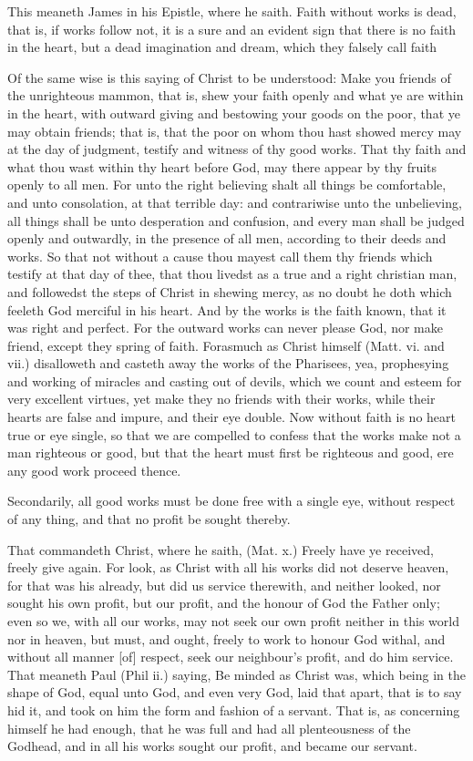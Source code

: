This meaneth James in his Epistle, where he saith. Faith 
without works is dead, that is, if works follow not, it is a 
sure and an evident sign that there is no faith in the heart, but 
a dead imagination and dream, which they falsely call faith 

Of the same wise is this saying of Christ to be understood:
Make you friends of the unrighteous mammon, that is, 
shew your faith openly and what ye are within in the heart, 
with outward giving and bestowing your goods on the poor, 
that ye may obtain friends; that is, that the poor on whom 
thou hast showed mercy may at the day of judgment, testify
and witness of thy good works. That thy faith and what 
thou wast within thy heart before God, may there appear 
by thy fruits openly to all men. For unto the right believing
shalt all things be comfortable, and unto consolation, 
at that terrible day: and contrariwise unto the unbelieving, 
all things shall be unto desperation and confusion, and 
every man shall be judged openly and outwardly, in the 
presence of all men, according to their deeds and works. 
So that not without a cause thou mayest call them thy 
friends which testify at that day of thee, that thou livedst as 
a true and a right christian man, and followedst the steps 
of Christ in shewing mercy, as no doubt he doth which 
feeleth God merciful in his heart. And by the works is the 
faith known, that it was right and perfect. For the outward 
works can never please God, nor make friend, except they 
spring of faith. Forasmuch as Christ himself (Matt. vi. and 
vii.) disalloweth and casteth away the works of the Pharisees, 
yea, prophesying and working of miracles and casting out 
of devils, which we count and esteem for very excellent 
virtues, yet make they no friends with their works, while 
their hearts are false and impure, and their eye double. 
Now without faith is no heart true or eye single, so that 
we are compelled to confess that the works make not a man 
righteous or good, but that the heart must first be righteous 
and good, ere any good work proceed thence. 


Secondarily, all good works must be done free with a 
single eye, without respect of any thing, and that no profit 
be sought thereby. 

That commandeth Christ, where he saith, (Mat. x.) Freely 
have ye received, freely give again. For look, as Christ 
with all his works did not deserve heaven, for that was his 
already, but did us service therewith, and neither looked, 
nor sought his own profit, but our profit, and the honour 
of God the Father only; even so we, with all our works, 
may not seek our own profit neither in this world nor in 
heaven, but must, and ought, freely to work to honour God 
withal, and without all manner [of] respect, seek our 
neighbour's profit, and do him service. That meaneth 
Paul (Phil ii.) saying, Be minded as Christ was, which 
being in the shape of God, equal unto God, and even very 
God, laid that apart, that is to say hid it, and took on him 
the form and fashion of a servant. That is, as concerning 
himself he had enough, that he was full and had all plenteousness
of the Godhead, and in all his works sought our 
profit, and became our servant. 

